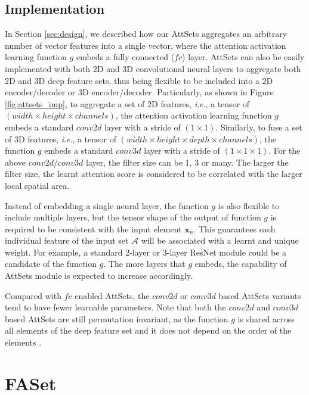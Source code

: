 \documentclass[twocolumn]{svjour3}    \pdfoutput=1
\newcommand{\nickname}{AttSets}
\newcommand{\ie}{\textit{i}.\textit{e}., }
\begin{document}
\subsection{Implementation}\label{sec:impl}
In Section \ref{sec:design}, we described how our \nickname{} aggregates an arbitrary number of vector features into a single vector, where the attention activation learning function $g$ embeds a fully connected ($fc$) layer. \nickname{} can also be easily implemented with both 2D and 3D convolutional neural layers to aggregate both 2D and 3D deep feature sets, thus being flexible to be included into a 2D encoder/decoder or 3D encoder/decoder. Particularly, as shown in Figure \ref{fig:attsets_imp}, to aggregate a set of 2D features, \ie a tensor of $(width\times height\times channels)$, the attention activation learning function $g$ embeds a standard $conv2d$ layer with a stride of $(1\times 1)$. Similarly, to fuse a set of 3D features, \ie a tensor of $(width\times height\times depth\times channels)$, the function $g$ embeds a standard $conv3d$ layer with a stride of $(1\times 1\times 1)$. For the above $conv2d$/$conv3d$ layer, the filter size can be 1, 3 or many. The larger the filter size, the learnt attention score is considered to be correlated with the larger local spatial area.

Instead of embedding a single neural layer, the function $g$ is also flexible to include multiple layers, but the tensor shape of the output of function $g$ is required to be consistent with the input element $\boldsymbol{x}_n$. This guarantees each individual feature of the input set $\mathcal{A}$ will be associated with a learnt and unique weight. For example, a standard 2-layer or 3-layer ResNet module \citep{He2016b} could be a candidate of the function $g$. The more layers that $g$ embeds, the capability of \nickname{} module is expected to increase accordingly.

Compared with $fc$ enabled \nickname{}, the $conv2d$ or $conv3d$ based \nickname{} variants tend to have fewer learnable parameters. Note that both the $conv2d$ and $conv3d$ based \nickname{} are still permutation invariant, as the function $g$ is shared across all elements of the deep feature set and it does not depend on the order of the elements \citep{Zaheer2017}.

\section{FASet}
\end{document}
